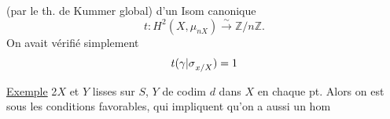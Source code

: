 (par le th. de Kummer global) d'un Isom canonique
\[
t:H^2(X,\mu_{nX})\overset{\sim}{\longrightarrow}\mathbb Z/n\mathbb Z.
\]
On avait vérifié simplement
\[
t({\gamma|\sigma}_{x/X})=1
\]

\uline{Exemple} 2\quad $X$ et $Y$ lisses sur $S$,
$Y$ de codim $d$ dans $X$ en chaque pt.
Alors on est sous les conditions favorables, qui impliquent qu'on a
aussi un hom
